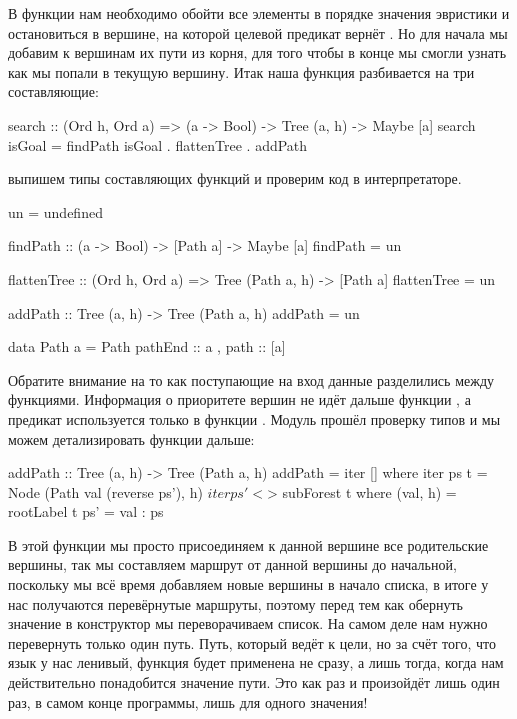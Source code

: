 В функции  нам необходимо обойти все элементы
в порядке значения эвристики и остановиться в вершине,
на которой целевой предикат вернёт . Но для начала мы
добавим к вершинам их пути из корня, для того чтобы в конце 
мы смогли узнать как мы попали в текущую вершину. 
Итак наша функция разбивается на три составляющие:

\begin{code}
search :: (Ord h, Ord a) => (a -> Bool) -> Tree (a, h) -> Maybe [a]
search isGoal =  findPath isGoal . flattenTree . addPath 
\end{code}

выпишем типы составляющих функций и проверим код в интерпретаторе.

\begin{code}
un = undefined

findPath :: (a -> Bool) -> [Path a] -> Maybe [a]
findPath = un

flattenTree :: (Ord h, Ord a) => Tree (Path a, h) -> [Path a]
flattenTree = un

addPath :: Tree (a, h) -> Tree (Path a, h)
addPath = un

data Path a = Path 
	{ pathEnd   :: a
	, path      :: [a]
	}
\end{code}

Обратите внимание на то как поступающие на вход 
данные разделились между функциями. Информация
о приоритете вершин не идёт дальше функции ,
а предикат  используется только в функции
. Модуль прошёл проверку типов и мы можем
детализировать функции дальше:

\begin{code}
addPath :: Tree (a, h) -> Tree (Path a, h)
addPath = iter []
    where iter ps t = Node (Path val (reverse ps'), h) $ 
            iter ps' <$> subForest t
            where (val, h)  = rootLabel t
                  ps'       = val : ps
\end{code}

В этой функции мы просто присоединяем к данной вершине
все родительские вершины, так мы составляем маршрут 
от данной вершины до начальной, поскольку мы всё время
добавляем новые вершины в начало списка, в итоге у нас получаются
перевёрнутые маршруты, поэтому перед тем как обернуть значение
в конструктор  мы переворачиваем список. 
На самом деле нам нужно перевернуть только один путь. 
Путь, который ведёт к цели, но за счёт того, что
язык у нас ленивый, функция  будет применена
не сразу, а лишь тогда, когда нам действительно понадобится
значение пути. Это как раз и произойдёт лишь один раз,
в самом конце программы, лишь для одного значения!

